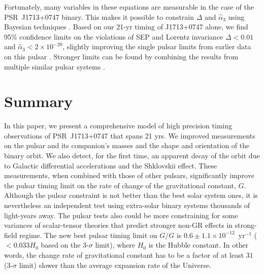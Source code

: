 Fortunately, many variables in these equations are measurable in the
case of the PSR~J1713+0747 binary. This makes it possible to constrain $\Delta$
and $\hat{\alpha}_3$ using Bayesian techniques 
\citep{sns+05, sfl+05, gsf+11}. Based on our 21-yr 
timing of J1713+0747 alone, we find 95\% confidence limits on the violations of SEP and
Lorentz invariance $\Delta < 0.01$ and $\hat{\alpha}_3<2\times10^{-20}$, 
slightly improving the single pulsar limits from earlier data on this pulsar
\citep{sns+05, sfl+05, gsf+11}.
Stronger limits can be found by combining the results from
multiple similar pulsar systems \citep{wex00,sfl+05, gsf+11}.


\section{Summary}
In this paper, we present a comprehensive model of high precision timing observations of
PSR~J1713+0747 that spans 21 yrs. 
We improved measurements on the pulsar and its companion's masses and the
shape and orientation of the binary orbit. We also detect, for the first time, an apparent
decay of the orbit due to Galactic differential accelerations and the Shklovskii effect.
These measurements, when combined with those of other pulsars, 
significantly improve the pulsar timing limit on the rate of change of the gravitational
constant, $\dot{G}$. Although the pulsar constraint is not better than the
best solar system ones, it is nevertheless an independent test using 
extra-solar binary systems thousands of light-years away. The pulsar tests
also could be more constraining for some
variances of scalar-tensor theories that predict stronger non-GR effects in
strong-field regime.
The new best pulsar timing limit on $\dot{G}/G$ is 
$0.6\pm1.1\times10^{-12}$~yr$^{-1}$ ($<0.033H_0$ based on the 3-$\sigma$ limit), where $H_0$ is the Hubble constant. 
In other words, the change rate of gravitational constant has to be a factor
of at least $31$ (3-$\sigma$ limit) slower than the average expansion rate of
the Universe.

